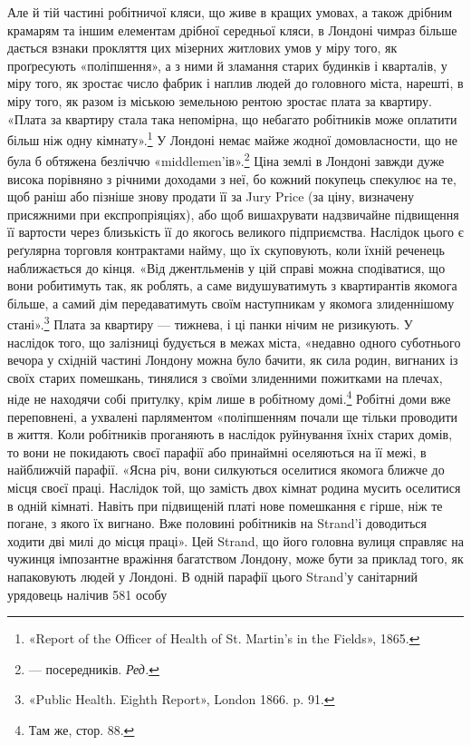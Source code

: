 Але й тій частині робітничої кляси, що живе в кращих умовах,
а також дрібним крамарям та іншим елементам дрібної
середньої кляси, в Лондоні чимраз більше дається взнаки прокляття
цих мізерних житлових умов у міру того, як проґресують
«поліпшення», а з ними й зламання старих будинків і кварталів,
у міру того, як зростає число фабрик і наплив людей до головного
міста, нарешті, в міру того, як разом із міською земельною
рентою зростає плата за квартиру. «Плата за квартиру стала
така непомірна, що небагато робітників може оплатити більш
ніж одну кімнату».\footnote{
«Report of the Officer of Health of St. Martin’s in the Fields», 1865.
} У Лондоні немає майже жодної домовласности,
що не була б обтяжена безліччю «middlemen’ів».\footnote*{
— посередників. \emph{Ред.}
} Ціна
землі в Лондоні завжди дуже висока порівняно з річними доходами
з неї, бо кожний покупець спекулює на те, щоб раніш або
пізніше знову продати її за Jury Price (за ціну, визначену присяжними
при експропріяціях), або щоб вишахрувати надзвичайне
підвищення її вартости через близькість її до якогось великого
підприємства. Наслідок цього є реґулярна торговля контрактами
найму, що їх скуповують, коли їхній реченець наближається
до кінця. «Від джентльменів у цій справі можна сподіватися, що
вони робитимуть так, як роблять, а саме видушуватимуть з
квартирантів якомога більше, а самий дім передаватимуть своїм
наступникам у якомога злиденнішому стані».\footnote{
«Public Health. Eighth Report», London 1866. p. 91.
} Плата за квартиру
— тижнева, і ці панки нічим не ризикують. У наслідок
того, що залізниці будується в межах міста, «недавно одного
суботнього вечора у східній частині Лондону можна було бачити,
як сила родин, вигнаних із своїх старих помешкань, тинялися
з своїми злиденними пожитками на плечах, ніде не находячи
собі притулку, крім лише в робітному домі.\footnote{
Там же, стор. 88.
} Робітні
доми вже переповнені, а ухвалені парляментом «поліпшенням
почали ще тільки проводити в життя. Коли робітників проганяють
в наслідок руйнування їхніх старих домів, то вони не покидають
своєї парафії або принаймні оселяються на її межі, в найближчій
парафії. «Ясна річ, вони силкуються оселитися якомога
ближче до місця своєї праці. Наслідок той, що замість двох кімнат
родина мусить оселитися в одній кімнаті. Навіть при підвищеній
платі нове помешкання є гірше, ніж те погане, з якого їх вигнано.
Вже половині робітників на Strand’і доводиться ходити дві милі
до місця праці». Цей Strand, що його головна вулиця справляє
на чужинця імпозантне вражіння багатством Лондону, може
бути за приклад того, як напаковують людей у Лондоні. В одній
парафії цього Strand’у санітарний урядовець налічив 581 особу
\parbreak{}  %
